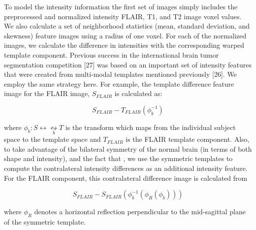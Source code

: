 \documentclass[11pt,]{article}
\begin{document}
To model the intensity information the first set of images simply
includes the preprocessed and normalized intensity FLAIR, T1, and T2
image voxel values. We also calculate a set of neighborhood statistics
(mean, standard deviation, and skewness) feature images using a
 radius of one voxel. For each of the normalized
images, we calculate the difference in intensities with the
corresponding warped template component. Previous success in the
international brain tumor segmentation competition {[}27{]} was based on
an important set of intensity features that were created from
multi-modal templates mentioned previously {[}26{]}. We employ the same
strategy here. For example, the template difference feature image for
the FLAIR image, \(S_{FLAIR}\) is calculated as:

\[S_{FLAIR} - T_{FLAIR}\left(\phi_b^{-1}\right)\]

where \(\phi_b: S \leftrightarrow \underset{b}{\leftrightsquigarrow} T\)
is the transform which maps from the individual subject space to the
template space and \(T_{FLAIR}\) is the FLAIR template component. Also,
to take advantage of the
bilateral symmetry of the normal brain (in terms of both shape and
intensity), and the fact that
,
we use the symmetric templates to compute the contralateral intensity
differences as an additional intensity feature. For the FLAIR component,
this contralateral difference image is calculated from

\[S_{FLAIR} - S_{FLAIR}\left(\phi_b^{-1}\left(\phi_R\left(\phi_b\right)\right)\right)\]

where \(\phi_R\) denotes a horizontal reflection perpendicular to the
mid-sagittal plane of the symmetric template.
\end{document}
